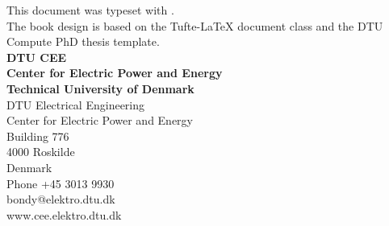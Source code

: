 \thispagestyle{empty} %
\frieze
\vspace*{\fill}
{\noindent
\sffamily
This document was typeset with \XeLaTeX.\\
\noindent
The book design is based on the Tufte-\LaTeX{} document class and the DTU Compute PhD thesis template.\\
\vspace{5cm}
\textbf{DTU CEE}\\
\textbf{Center for Electric Power and Energy}\\
\textbf{Technical University of Denmark}\\
\vspace{0.5cm}
DTU Electrical Engineering\\
Center for Electric Power and Energy\\
Building 776\\
4000 Roskilde\\
Denmark\\
Phone +45 3013 9930\\
bondy@elektro.dtu.dk\\
www.cee.elektro.dtu.dk\\
\normalsize
\normalfont}
\vspace*{2.5cm}
